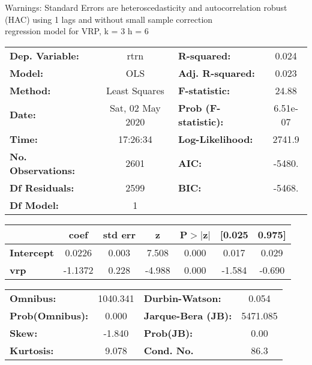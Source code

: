 Warnings: \newline
 [1] Standard Errors are heteroscedasticity and autocorrelation robust (HAC) using 1 lags and without small sample correction\\ 

regression model for VRP, k = 3 h = 6\begin{center}
\begin{tabular}{lclc}
\toprule
\textbf{Dep. Variable:}    &       rtrn       & \textbf{  R-squared:         } &     0.024   \\
\textbf{Model:}            &       OLS        & \textbf{  Adj. R-squared:    } &     0.023   \\
\textbf{Method:}           &  Least Squares   & \textbf{  F-statistic:       } &     24.88   \\
\textbf{Date:}             & Sat, 02 May 2020 & \textbf{  Prob (F-statistic):} &  6.51e-07   \\
\textbf{Time:}             &     17:26:34     & \textbf{  Log-Likelihood:    } &    2741.9   \\
\textbf{No. Observations:} &        2601      & \textbf{  AIC:               } &    -5480.   \\
\textbf{Df Residuals:}     &        2599      & \textbf{  BIC:               } &    -5468.   \\
\textbf{Df Model:}         &           1      & \textbf{                     } &             \\
\bottomrule
\end{tabular}
\begin{tabular}{lcccccc}
                   & \textbf{coef} & \textbf{std err} & \textbf{z} & \textbf{P$> |$z$|$} & \textbf{[0.025} & \textbf{0.975]}  \\
\midrule
\textbf{Intercept} &       0.0226  &        0.003     &     7.508  &         0.000        &        0.017    &        0.029     \\
\textbf{vrp}       &      -1.1372  &        0.228     &    -4.988  &         0.000        &       -1.584    &       -0.690     \\
\bottomrule
\end{tabular}
\begin{tabular}{lclc}
\textbf{Omnibus:}       & 1040.341 & \textbf{  Durbin-Watson:     } &    0.054  \\
\textbf{Prob(Omnibus):} &   0.000  & \textbf{  Jarque-Bera (JB):  } & 5471.085  \\
\textbf{Skew:}          &  -1.840  & \textbf{  Prob(JB):          } &     0.00  \\
\textbf{Kurtosis:}      &   9.078  & \textbf{  Cond. No.          } &     86.3  \\
\bottomrule
\end{tabular}
\end{center}

